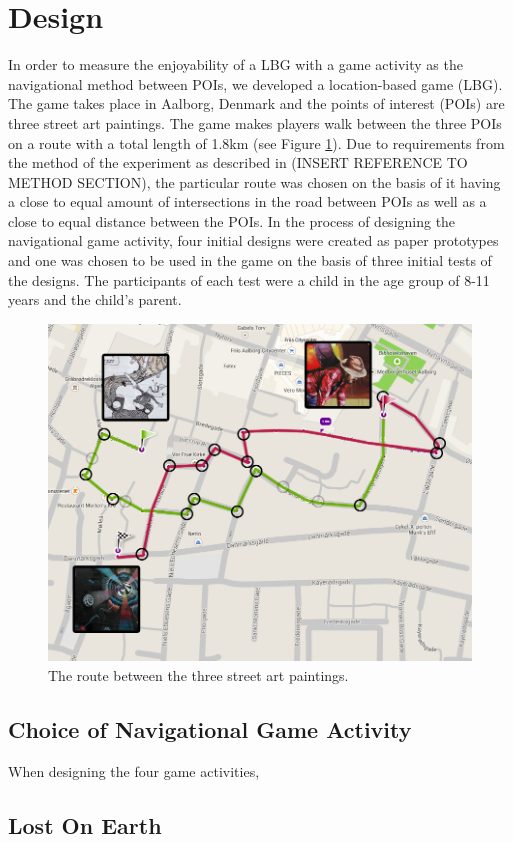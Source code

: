 \section{Design}
In order to measure the enjoyability of a LBG with a game activity as the navigational method between POIs, we developed a location-based game (LBG). The game takes place in Aalborg, Denmark and the points of interest (POIs) are three street art paintings\cite{streetart}. The game makes players walk between the three POIs on a route with a total length of 1.8km (see Figure \ref{FinalRoute}). Due to requirements from the method of the experiment as described in (INSERT REFERENCE TO METHOD SECTION), the particular route was chosen on the basis of it having a close to equal amount of intersections in the road between POIs as well as a close to equal distance between the POIs. In the process of designing the navigational game activity, four initial designs were created as paper prototypes and one was chosen to be used in the game on the basis of three initial tests of the designs. The participants of each test were a child in the age group of 8-11 years and the child's parent.

\begin{figure}[hbtp]
\centering
\includegraphics[scale=0.3]{Pics/FinalRoute.png}
\caption{The route between the three street art paintings.}
\label{FinalRoute}
\end{figure}

\subsection{Choice of Navigational Game Activity}
When designing the four game activities, 

\subsection{Lost On Earth}
